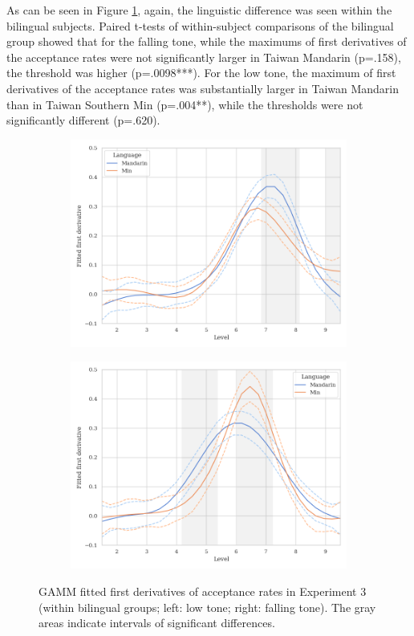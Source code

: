 As can be seen in Figure \ref{Figure:E3GAMM_bilingual}, again, the linguistic difference was seen within the bilingual subjects. Paired t-tests of within-subject comparisons of the bilingual group showed that for the falling tone, while the maximums of first derivatives of the acceptance rates were not significantly larger in Taiwan Mandarin (p=.158), the threshold was higher (p=.0098***). For the low tone, the maximum of first derivatives of the acceptance rates was substantially larger in Taiwan Mandarin than in Taiwan Southern Min (p=.004**), while the thresholds were not significantly different (p=.620).

\begin{figure}[hbt!]
\centering
\begin{subfigure}[b]{.45\textwidth}
\centering
\includegraphics[width=\textwidth]{figures/E3/Tone21_speed_GAMM_bilingual.png}
\end{subfigure}
\hfill
\begin{subfigure}[b]{.45\textwidth}
\centering
\includegraphics[width=\textwidth]{figures/E3/Tone51_speed_GAMM_bilingual.png}
\end{subfigure}
\caption{GAMM fitted first derivatives of acceptance rates in Experiment 3 (within bilingual groups; left: low tone; right: falling tone). The gray areas indicate intervals of significant differences.}
\label{Figure:E3GAMM_bilingual}
\end{figure}

